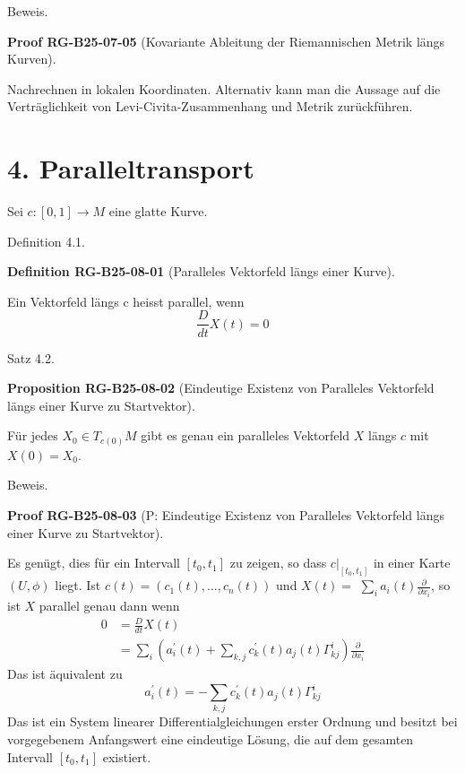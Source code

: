 \documentclass[10pt, letterpaper]{article}
\newcommand{\CustomHeading}[3]{%
  \par\medskip\noindent%
  \textbf{#1 #2} \textnormal{(#3)}.\enskip%
}
\newenvironment{DEF}[2]{\begin{unitbox}\CustomHeading{Definition}{#1}{#2}}{\end{unitbox}}
\newenvironment{PROP}[2]{\begin{unitbox}\CustomHeading{Proposition}{#1}{#2}}{\end{unitbox}}
\newenvironment{PROOF}[2]{\begin{unitbox}\CustomHeading{Proof}{#1}{#2}}{\end{unitbox}}
\begin{document}
Beweis. 

\begin{PROOF}{RG-B25-07-05}{Kovariante Ableitung der Riemannischen Metrik längs Kurven}
Nachrechnen in lokalen Koordinaten. Alternativ kann man die Aussage auf die Verträglichkeit von Levi-Civita-Zusammenhang 
und Metrik zurückführen.
\end{PROOF}


\pagebreak

\section*{4. Paralleltransport}


Sei $c:[0,1] \rightarrow M$ eine glatte Kurve.


Definition 4.1. 


\begin{DEF}{RG-B25-08-01}{Paralleles Vektorfeld längs einer Kurve}
Ein Vektorfeld längs c heisst parallel, wenn
$$
\frac{D}{d t} X(t)=0
$$
\end{DEF}


Satz 4.2. 


\begin{PROP}{RG-B25-08-02}{Eindeutige Existenz von Paralleles Vektorfeld längs einer Kurve zu Startvektor}
Für jedes $X_{0} \in T_{c(0)} M$ gibt es genau ein paralleles Vektorfeld $X$ längs $c$ mit $X(0)=X_{0}$.
\end{PROP}

Beweis. 


\begin{PROOF}{RG-B25-08-03}{P: Eindeutige Existenz von Paralleles Vektorfeld längs einer Kurve zu Startvektor}
Es genügt, dies für ein Intervall $\left[t_{0}, t_{1}\right]$ zu zeigen, so dass $\left.c\right|_{\left[t_{0}, t_{1}\right]}$ in einer Karte $(U, \phi)$ liegt. Ist $c(t)=\left(c_{1}(t), \ldots, c_{n}(t)\right)$ und $X(t)=$ $\sum_{i} a_{i}(t) \frac{\partial}{\partial x_{i}}$, so ist $X$ parallel genau dann wenn
$$
\begin{aligned}
0 & =\frac{D}{d t} X(t) \\
& =\sum_{i}\left(a_{i}^{\prime}(t)+\sum_{k, j} c_{k}^{\prime}(t) a_{j}(t) \Gamma_{k j}^{i}\right) \frac{\partial}{\partial x_{i}}
\end{aligned}
$$
Das ist äquivalent zu
$$
a_{i}^{\prime}(t)=-\sum_{k, j} c_{k}^{\prime}(t) a_{j}(t) \Gamma_{k j}^{i}
$$
Das ist ein System linearer Differentialgleichungen erster Ordnung und besitzt bei vorgegebenem Anfangswert eine eindeutige Lösung, die auf dem gesamten Intervall $\left[t_{0}, t_{1}\right]$ existiert.
\end{PROOF}
\end{document}
